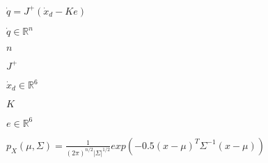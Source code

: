 \documentclass{article}
\begin{document}
$ \dot{q} = J^+ (\dot{x}_d - K e) $
\pagebreak

$\dot{q} \in \mathbb{R}^n$
\pagebreak

$n$
\pagebreak

$ J^+ $
\pagebreak

$\dot{x}_d \in \mathbb{R}^6$
\pagebreak

$ K $
\pagebreak

$e \in \mathbb{R}^6$
\pagebreak

$ p_X(\mu, \Sigma) = \frac{1}{(2\pi)^{n/2}|\Sigma|^{1/2}}exp(-0.5(x - \mu)^T\Sigma^{-1}(x - \mu))$
\pagebreak
\end{document}

